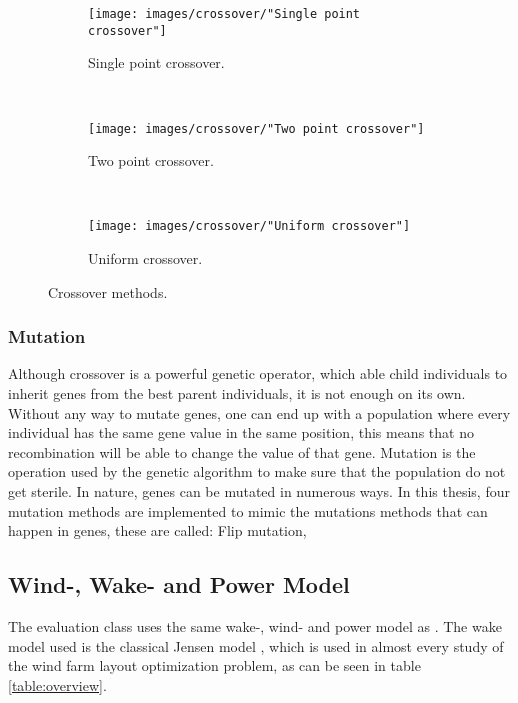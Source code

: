 \begin{figure}[h!]
    \centering
    \begin{subfigure}[b]{0.3\textwidth}
        \texttt{[image: images/crossover/"Single point crossover"]}
        \caption{Single point crossover.}
        \label{figure:single point crossover}
    \end{subfigure}
    ~ 
    \begin{subfigure}[b]{0.3\textwidth}
        \texttt{[image: images/crossover/"Two point crossover"]}
        \caption{Two point crossover.}
        \label{figure:two point crossover}
    \end{subfigure}
    ~
    \begin{subfigure}[b]{0.3\textwidth}
        \texttt{[image: images/crossover/"Uniform crossover"]}
        \caption{Uniform crossover.}
        \label{figure:uniform crossover}
    \end{subfigure}
    \caption{Crossover methods.}\label{figure:crossover methods}
\end{figure}


\subsubsection{Mutation}
Although crossover is a powerful genetic operator, which able child individuals to inherit genes from the best parent individuals, it is not enough on its own. Without any way to mutate genes, one can end up with a population where every individual has the same gene value in the same position, this means that no recombination will be able to change the value of that gene. Mutation is the operation used by the genetic algorithm to make sure that the population do not get sterile. In nature, genes can be mutated in numerous ways. In this thesis, four mutation methods are implemented to mimic the mutations methods that can happen in genes, these are called: Flip mutation, 


\subsection{Wind-, Wake- and Power Model}\label{subsection:wind-, wake- and power model}
The evaluation class uses the same wake-, wind- and power model as \cite{Kusiak}. The wake model used is the classical Jensen model \citep{Jensen}, which is used in almost every study of the wind farm layout optimization problem, as can be seen in table \ref{table:overview}. \\

